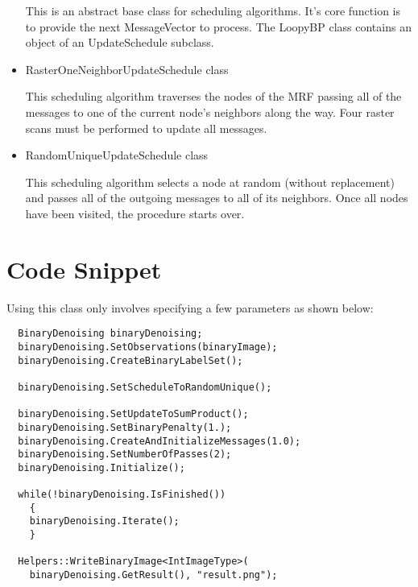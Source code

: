 \documentclass{InsightArticle}
\begin{document}
\begin{itemize}
This is an abstract base class for scheduling algorithms. It's core function is to provide the next MessageVector to process.  The LoopyBP class contains an object of an UpdateSchedule subclass.

\item RasterOneNeighborUpdateSchedule class

This scheduling algorithm traverses the nodes of the MRF passing all of the messages to one of the current node's neighbors along the way. Four raster scans must be performed to update all messages.

\item RandomUniqueUpdateSchedule class

This scheduling algorithm selects a node at random (without replacement) and passes all of the outgoing messages to all of its neighbors. Once all nodes have been visited, the procedure starts over.

\end{itemize}

\section{Code Snippet}

Using this class only involves specifying a few parameters as shown below:

\begin{verbatim}
  BinaryDenoising binaryDenoising;
  binaryDenoising.SetObservations(binaryImage);
  binaryDenoising.CreateBinaryLabelSet();

  binaryDenoising.SetScheduleToRandomUnique();

  binaryDenoising.SetUpdateToSumProduct();
  binaryDenoising.SetBinaryPenalty(1.);
  binaryDenoising.CreateAndInitializeMessages(1.0);
  binaryDenoising.SetNumberOfPasses(2);
  binaryDenoising.Initialize();

  while(!binaryDenoising.IsFinished())
    {
    binaryDenoising.Iterate();
    }

  Helpers::WriteBinaryImage<IntImageType>(
    binaryDenoising.GetResult(), "result.png");

\end{verbatim}
\end{document}
